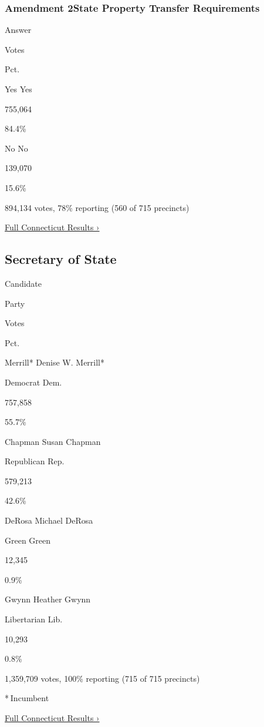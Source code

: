 \hypertarget{amendment-2state-property-transfer-requirements}{%
\subsubsection{Amendment 2State Property Transfer
Requirements}\label{amendment-2state-property-transfer-requirements}}

Answer

Votes

Pct.

 Yes Yes

755,064

84.4\%

 No No

139,070

15.6\%

894,134 votes, 78\% reporting (560 of 715 precincts)

\href{https://www.nytimes3xbfgragh.onion/interactive/2018/11/06/us/elections/results-connecticut-elections.html}{Full
Connecticut Results ›}

\hypertarget{secretary-of-state}{%
\subsection{Secretary of State}\label{secretary-of-state}}

Candidate

Party

Votes

Pct.

 Merrill* Denise W. Merrill*

Democrat Dem.

757,858

55.7\%

 Chapman Susan Chapman

Republican Rep.

579,213

42.6\%

 DeRosa Michael DeRosa

Green Green

12,345

0.9\%

 Gwynn Heather Gwynn

Libertarian Lib.

10,293

0.8\%

1,359,709 votes, 100\% reporting (715 of 715 precincts)

* Incumbent

\href{https://www.nytimes3xbfgragh.onion/interactive/2018/11/06/us/elections/results-connecticut-elections.html}{Full
Connecticut Results ›}


